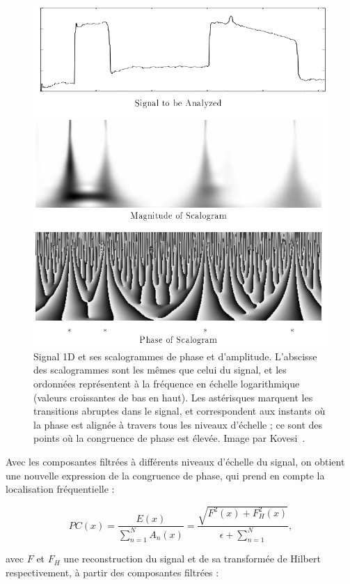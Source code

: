 \begin{figure}
    \centering
    \includegraphics[width=.85\textwidth]{contenu/resources/images/phase_congruence_scalogram}
    \caption[Scalogramme d'un signal présentant des points caractéristiques]{Signal 1D et ses scalogrammes de phase et d'amplitude. L'abscisse des scalogrammes sont les mêmes que celui du signal, et les ordonnées représentent à la fréquence en échelle logarithmique (valeurs croissantes de bas en haut). Les astérisques marquent les transitions abruptes dans le signal, et correspondent aux instants où la phase est alignée à travers tous les niveaux d'échelle ; ce sont des points où la congruence de phase est élevée. Image par Kovesi~\cite{kovesi_image_1995}.}
    \label{fig:phase-congruence-scalogram}
\end{figure}

Avec les composantes filtrées à différents niveaux d'échelle du signal, on obtient une nouvelle expression de la congruence de phase, qui prend en compte la localisation fréquentielle :

\begin{equation}
    PC(x) = \frac{E(x)}{\sum_{n=1}^{N} A_n(x)} = \frac{\sqrt{F^2(x)+F_H^2(x)}}{\epsilon + \sum_{n=1}^{N}},
\end{equation}

avec $F$ et $F_H$ une reconstruction du signal et de sa transformée de Hilbert respectivement, à partir des composantes filtrées :

